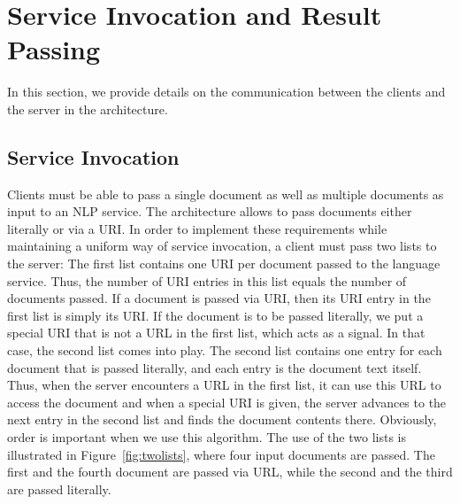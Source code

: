   
\section{Service Invocation and Result Passing}
In this section, we provide details on the communication between the
clients and the server in the \sa architecture.

\subsection{Service Invocation}
\label{sec:invoc}
Clients must be able to pass a single document as well as multiple
documents as input to an NLP service. The \sa architecture allows to
pass documents either literally or via a URI. In order to implement
these requirements while maintaining a uniform way of service
invocation, a client must pass two lists to the server: The first list
contains one URI per document passed to the language service.  Thus,
the number of URI entries in this list equals the number of documents
passed. If a document is passed via URI, then its URI entry in the
first list is simply its URI. If the document is to be passed
literally, we put a special URI that is not a URL in the first list,
which acts as a signal. In that case, the second list comes into
play. The second list contains one entry for each document that is
passed literally, and each entry is the document text itself. Thus,
when the server encounters a URL in the first list, it can use this
URL to access the document and when a special URI is given, the server
advances to the next entry in the second list and finds the document
contents there. Obviously, order is important when we use this
algorithm. The use of the two lists is illustrated in
Figure~\ref{fig:twolists}, where four input documents are passed. The
first and the fourth document are passed via URL, while the second and
the third are passed literally.

